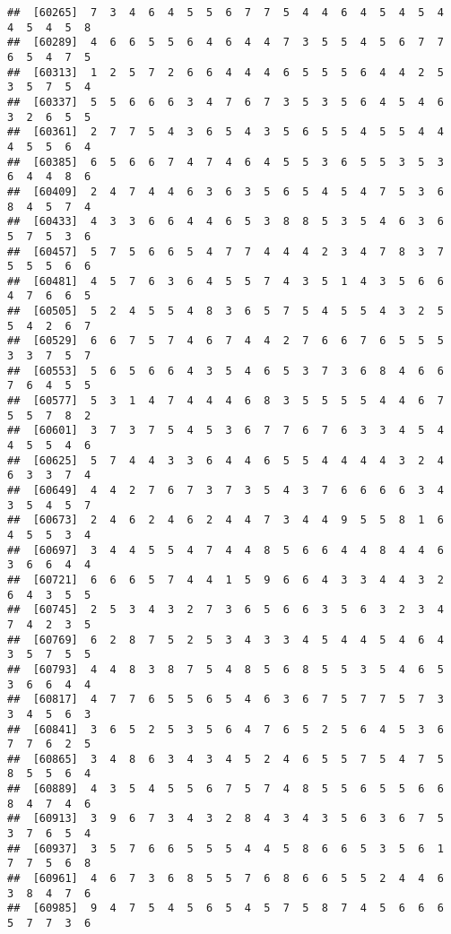 \documentclass[
]{book}
\begin{document}
\begin{verbatim}
##  [60265]  7  3  4  6  4  5  5  6  7  7  5  4  4  6  4  5  4  5  4  4  5  4  5  8
##  [60289]  4  6  6  5  5  6  4  6  4  4  7  3  5  5  4  5  6  7  7  6  5  4  7  5
##  [60313]  1  2  5  7  2  6  6  4  4  4  6  5  5  5  6  4  4  2  5  3  5  7  5  4
##  [60337]  5  5  6  6  6  3  4  7  6  7  3  5  3  5  6  4  5  4  6  3  2  6  5  5
##  [60361]  2  7  7  5  4  3  6  5  4  3  5  6  5  5  4  5  5  4  4  4  5  5  6  4
##  [60385]  6  5  6  6  7  4  7  4  6  4  5  5  3  6  5  5  3  5  3  6  4  4  8  6
##  [60409]  2  4  7  4  4  6  3  6  3  5  6  5  4  5  4  7  5  3  6  8  4  5  7  4
##  [60433]  4  3  3  6  6  4  4  6  5  3  8  8  5  3  5  4  6  3  6  5  7  5  3  6
##  [60457]  5  7  5  6  6  5  4  7  7  4  4  4  2  3  4  7  8  3  7  5  5  5  6  6
##  [60481]  4  5  7  6  3  6  4  5  5  7  4  3  5  1  4  3  5  6  6  4  7  6  6  5
##  [60505]  5  2  4  5  5  4  8  3  6  5  7  5  4  5  5  4  3  2  5  5  4  2  6  7
##  [60529]  6  6  7  5  7  4  6  7  4  4  2  7  6  6  7  6  5  5  5  3  3  7  5  7
##  [60553]  5  6  5  6  6  4  3  5  4  6  5  3  7  3  6  8  4  6  6  7  6  4  5  5
##  [60577]  5  3  1  4  7  4  4  4  6  8  3  5  5  5  5  4  4  6  7  5  5  7  8  2
##  [60601]  3  7  3  7  5  4  5  3  6  7  7  6  7  6  3  3  4  5  4  4  5  5  4  6
##  [60625]  5  7  4  4  3  3  6  4  4  6  5  5  4  4  4  4  3  2  4  6  3  3  7  4
##  [60649]  4  4  2  7  6  7  3  7  3  5  4  3  7  6  6  6  6  3  4  3  5  4  5  7
##  [60673]  2  4  6  2  4  6  2  4  4  7  3  4  4  9  5  5  8  1  6  4  5  5  3  4
##  [60697]  3  4  4  5  5  4  7  4  4  8  5  6  6  4  4  8  4  4  6  3  6  6  4  4
##  [60721]  6  6  6  5  7  4  4  1  5  9  6  6  4  3  3  4  4  3  2  6  4  3  5  5
##  [60745]  2  5  3  4  3  2  7  3  6  5  6  6  3  5  6  3  2  3  4  7  4  2  3  5
##  [60769]  6  2  8  7  5  2  5  3  4  3  3  4  5  4  4  5  4  6  4  3  5  7  5  5
##  [60793]  4  4  8  3  8  7  5  4  8  5  6  8  5  5  3  5  4  6  5  3  6  6  4  4
##  [60817]  4  7  7  6  5  5  6  5  4  6  3  6  7  5  7  7  5  7  3  3  4  5  6  3
##  [60841]  3  6  5  2  5  3  5  6  4  7  6  5  2  5  6  4  5  3  6  7  7  6  2  5
##  [60865]  3  4  8  6  3  4  3  4  5  2  4  6  5  5  7  5  4  7  5  8  5  5  6  4
##  [60889]  4  3  5  4  5  5  6  7  5  7  4  8  5  5  6  5  5  6  6  8  4  7  4  6
##  [60913]  3  9  6  7  3  4  3  2  8  4  3  4  3  5  6  3  6  7  5  3  7  6  5  4
##  [60937]  3  5  7  6  6  5  5  5  4  4  5  8  6  6  5  3  5  6  1  7  7  5  6  8
##  [60961]  4  6  7  3  6  8  5  5  7  6  8  6  6  5  5  2  4  4  6  3  8  4  7  6
##  [60985]  9  4  7  5  4  5  6  5  4  5  7  5  8  7  4  5  6  6  6  5  7  7  3  6

\end{verbatim}
\end{document}
